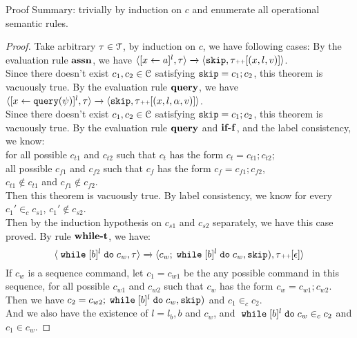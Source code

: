 	Proof Summary: trivially by induction on $c$ and enumerate all operational semantic rules.
\begin{proof}
	Take arbitrary $\mathtt{\tau} \in \mathcal{T}$, by induction on $c$, we have following cases:
		By the evaluation rule $\rname{assn}$, we have
		$
		{
		\langle [\mathrel{ {x} \leftarrow a }]^{l},  \mathtt{\tau}  \rangle 
		\xrightarrow{} 
		\langle \mathtt{skip}, \mathtt{\tau} {\scriptscriptstyle ++} [({x}, l, v) ] \rangle
		}$.
		\\
		Since there doesn't exist $c_1, c_2 \in \mathcal{C}$ satisfying $\mathtt{skip} = c_1; c_2$, this theorem is vacuously true.
		By the evaluation rule $\rname{query}$, we have
		$
		{
		\langle [\mathrel{ {x} \leftarrow {\tt query}(\psi) }]^{l},  \mathtt{\tau}  \rangle 
		\xrightarrow{} 
		\langle \mathtt{skip}, \mathtt{\tau} {\scriptscriptstyle ++} [({x}, l, \alpha, v) ] \rangle
		}$.
		\\
		Since there doesn't exist $c_1, c_2 \in \mathcal{C}$ satisfying $\mathtt{skip} = c_1; c_2$, this theorem is vacuously true.
		By the evaluation rule $\rname{query}$ and $\rname{if-f}$, and the label consistency, we know:
		\\
		for all possible $c_{t1}$ and $c_{t2}$ 
		such that $c_t$ has the form $c_t = c_{t1};c_{t2}$;
		\\
		all possible $c_{f1}$ and $c_{f2}$ 
		such that $c_f$ has the form $c_f = c_{f1};c_{f2}$,
		\\
		$c_{t1} \notin c_{t1}$ and $c_{f1} \notin c_{f2}$.
		\\
		Then this theorem is vacuously true.
		By label consistency, we know for every $c_1' \in_c c_{s1}$, $c_1' \notin c_{s2}$.
		\\
		Then by the induction hypothesis on $c_{s1}$ and $c_{s2}$ separately, we have this case proved.
		By rule $\rname{while-t}$, we have:
		\[
			\langle {\;\ensuremath{\mathtt{while}}\;[b]^{l} \;\ensuremath{\mathtt{do}}\;c_w, \ensuremath{\mathtt{\tau}}} \rangle
			\xrightarrow{} 
			\langle {
			c_w; \;\ensuremath{\mathtt{while}}\;[b]^{l} \;\ensuremath{\mathtt{do}}\;c_w,  \ensuremath{\mathtt{skip}}),
			\ensuremath{\mathtt{\tau}}{\scriptscriptstyle ++}[\ensuremath{\mathtt{\epsilon}}]} \rangle
		\]
		If $c_w$ is a sequence command,
		let $c_1 = c_{w1}$ be the any possible command in this sequence, for all possible $c_{w1}$ and $c_{w2}$ 
		such that $c_w$ has the form $c_w = c_{w1};c_{w2}$.
		\\
		Then we have $c_2 = c_{w2};\;\mathtt{while}\; [b]^{l} \;\mathtt{do}\; c_w,  \mathtt{skip})$ and $c_1 \in_c c_2$.
		\\
		And we also have the existence of $l = l_b, b$ and $c_w$, and $\;\mathtt{while}\; [b]^{l} \;\mathtt{do}\; c_w \in_c c_2$ and  $c_1 \in c_w$.

\end{proof}
